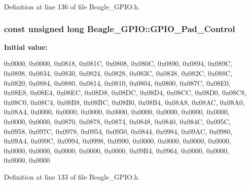 \-Definition at line 136 of file \-Beagle\-\_\-\-G\-P\-I\-O.\-h.

\hypertarget{class_beagle___g_p_i_o_ae4a0a2a56a0ba31145a5f41eb3439886}{
\subsubsection[{\-G\-P\-I\-O\-\_\-\-Pad\-\_\-\-Control}]{\setlength{\rightskip}{0pt plus 5cm}const unsigned long {\bf \-Beagle\-\_\-\-G\-P\-I\-O\-::\-G\-P\-I\-O\-\_\-\-Pad\-\_\-\-Control}}}\label{class_beagle___g_p_i_o_ae4a0a2a56a0ba31145a5f41eb3439886}
{\bfseries \-Initial value\-:}
\begin{DoxyCode}

{
        0x0000, 0x0000, 0x0818, 0x081C, 0x0808, 
        0x080C, 0x0890, 0x0894, 0x089C, 0x0898, 
        0x0834, 0x0830, 0x0824, 0x0828, 0x083C, 
        0x0838, 0x082C, 0x088C, 0x0820, 0x0884, 
        0x0880, 0x0814, 0x0810, 0x0804, 0x0800, 
        0x087C, 0x08E0, 0x08E8, 0x08E4, 0x08EC, 
        0x08D8, 0x08DC, 0x08D4, 0x08CC, 0x08D0, 
        0x08C8, 0x08C0, 0x08C4, 0x08B8, 0x08BC, 
        0x08B0, 0x08B4, 0x08A8, 0x08AC, 0x08A0, 
        0x08A4,                                 
        0x0000, 0x0000, 0x0000, 0x0000, 0x0000, 
        0x0000, 0x0000, 0x0000, 0x0000, 0x0000, 
        0x0870, 0x0878, 0x0874, 0x0848, 0x0840, 
        0x084C, 0x095C, 0x0958, 0x097C, 0x0978, 
        0x0954, 0x0950, 0x0844, 0x0984, 0x09AC, 
        0x0980, 0x09A4, 0x099C, 0x0994, 0x0998, 
        0x0990, 0x0000, 0x0000, 0x0000, 0x0000, 
        0x0000, 0x0000, 0x0000, 0x0000, 0x0000, 
        0x09B4, 0x0964, 0x0000, 0x0000, 0x0000, 
        0x0000                                  
}
\end{DoxyCode}


\-Definition at line 133 of file \-Beagle\-\_\-\-G\-P\-I\-O.\-h.

